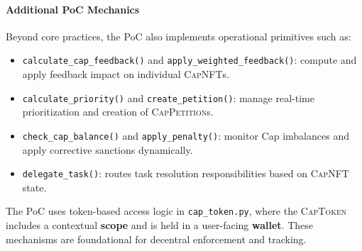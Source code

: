 \documentclass[12pt, a4paper]{scrartcl}
\begin{document}
\par


\newpage %
\printbibliography %


\paragraph*{Additional PoC Mechanics}

Beyond core practices, the PoC also implements operational primitives such as:

\begin{itemize}
    \item \texttt{calculate\_cap\_feedback()} and \texttt{apply\_weighted\_feedback()}: compute and apply feedback impact on individual \textsc{CapNFT}s.
    \item \texttt{calculate\_priority()} and \texttt{create\_petition()}: manage real-time prioritization and creation of \textsc{CapPetition}s.
    \item \texttt{check\_cap\_balance()} and \texttt{apply\_penalty()}: monitor Cap imbalances and apply corrective sanctions dynamically.
    \item \texttt{delegate\_task()}: routes task resolution responsibilities based on \textsc{CapNFT} state.
\end{itemize}

The PoC uses token-based access logic in \texttt{cap\_token.py}, where the \textsc{CapToken} includes a contextual \textbf{scope} and is held in a user-facing \textbf{wallet}. These mechanisms are foundational for decentral enforcement and tracking.
\end{document}
